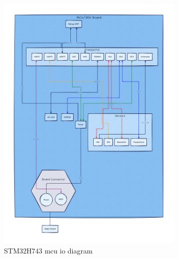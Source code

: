 \begin{figure}
    \centering
    \includegraphics[width=0.8\textwidth]{assets/diagrams/mcu_board.png}
    \caption{STM32H743 \gls{mcu} \gls{io} diagram}
    \label{fig:mcu-diagram}
\end{figure}

